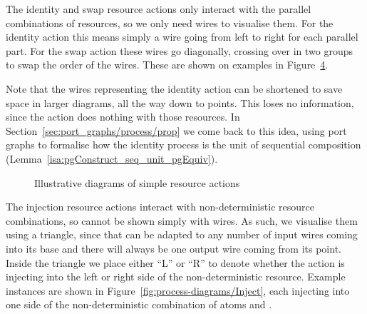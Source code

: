 \documentclass[class=smolathesis,crop=false]{standalone}
\begin{document}
\begin{figure}[h]
  \centering
  
  \caption{}
  \label{fig:process-diagrams/Primitive}
\end{figure}

\cbstart
The identity and swap resource actions only interact with the parallel combinations of resources, so we only need wires to visualise them.
For the identity action this means simply a wire going from left to right for each parallel part.
For the swap action these wires go diagonally, crossing over in two groups to swap the order of the wires.
These are shown on examples in Figure~\ref{fig:process-diagrams/Identity+Swap}.

Note that the wires representing the identity action can be shortened to save space in larger diagrams, all the way down to points.
This loses no information, since the action does nothing with those resources.
In Section~\ref{sec:port_graphs/process/prop} we come back to this idea, using port graphs to formalise how the identity process is the unit of sequential composition (Lemma~\ref{isa:pgConstruct_seq_unit_pgEquiv}).
\cbend

\begin{figure}[h]
  \begin{subfigure}{0.49\textwidth}
    \centering
    
    \caption{}
    \label{fig:process-diagrams/Identity}
  \end{subfigure}
  \begin{subfigure}{0.49\textwidth}
    \centering
    
    \caption{}
    \label{fig:process-diagrams/Swap}
  \end{subfigure}
  \caption{Illustrative diagrams of simple resource actions}
    \label{fig:process-diagrams/Identity+Swap}
\end{figure}

\cbstart
The injection resource actions interact with non-deterministic resource combinations, so cannot be shown simply with wires.
As such, we visualise them using a triangle, since that can be adapted to any number of input wires coming into its base and there will always be one output wire coming from its point.
Inside the triangle we place either ``L'' or ``R'' to denote whether the action is injecting into the left or right side of the non-deterministic resource.
Example instances are shown in Figure~\ref{fig:process-diagrams/Inject}, each injecting into one side of the non-deterministic combination of atoms  and .
\cbend
\end{document}
